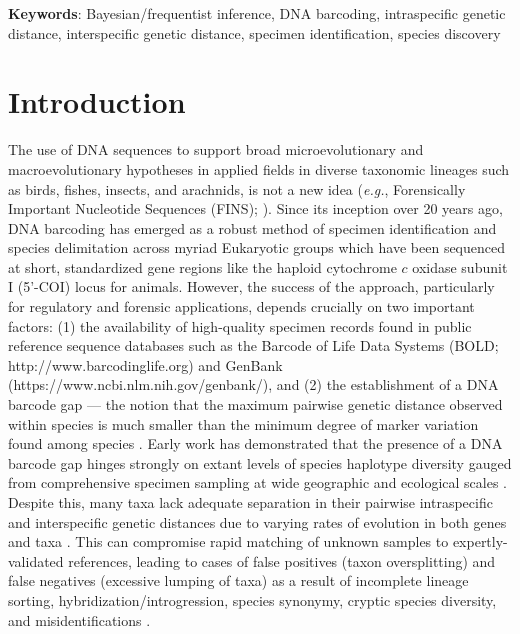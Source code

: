 \documentclass[12pt]{article}
\begin{document}
\textbf{Keywords}: Bayesian/frequentist inference, DNA barcoding, intraspecific genetic \\ distance, interspecific genetic distance, specimen identification, species discovery

\vspace{2mm}

\section{Introduction}

The use of DNA sequences to support broad microevolutionary and macroevolutionary hypotheses in applied fields in diverse taxonomic lineages such as birds, fishes, insects, and arachnids, is not a new idea (\textit{e.g.}, Forensically Important Nucleotide Sequences (FINS); \citet{bartlett1992fins}). Since its inception over 20 years ago, DNA barcoding \citep{hebert2003biological, hebert2003barcoding} has emerged as a robust method of specimen identification and species delimitation across myriad Eukaryotic groups which have been sequenced at short, standardized gene regions like the haploid cytochrome $c$ oxidase subunit I (5'-COI) locus for animals. However, the success of the approach, particularly for regulatory and forensic applications, depends crucially on two important factors: (1) the availability of high-quality specimen records found in public reference sequence databases such as the Barcode of Life Data Systems (BOLD; http://www.barcodinglife.org) \citep{ratnasingham2007bold} and GenBank (https://www.ncbi.nlm.nih.gov/genbank/), and (2) the establishment of a DNA barcode gap --- the notion that the maximum pairwise genetic distance observed within species is much smaller than the minimum degree of marker variation found among species \citep{meyer2005dna, meier2008use}. Early work has demonstrated that the presence of a DNA barcode gap hinges strongly on extant levels of species haplotype diversity gauged from comprehensive specimen sampling at wide geographic and ecological scales \citep{bergsten2012effect, candek2015dna}. Despite this, many taxa lack adequate separation in their pairwise intraspecific and interspecific genetic distances due to varying rates of evolution in both genes and taxa \citep{pentinsaari2016molecular}. This can compromise rapid matching of unknown samples to expertly-validated references, leading to cases of false positives (taxon oversplitting) and false negatives (excessive lumping of taxa) as a result of incomplete lineage sorting, hybridization/introgression, species synonymy, cryptic species diversity, and misidentifications \citep{hubert2015dna, phillips2022lack}.
\end{document}
